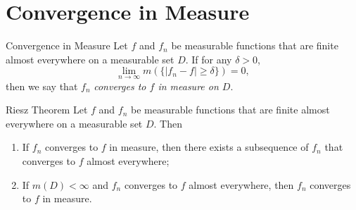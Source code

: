 \section{Convergence in Measure}

\begin{definition}{Convergence in Measure}{}
  Let $f$ and $f_n$ be measurable functions that are finite almost everywhere on
  a measurable set $D$. If for any $\delta > 0$,
  \begin{equation}
    \lim \limits _{n \rightarrow \infty} m(\{|f_n - f| \geq \delta\}) = 0,
  \end{equation}
  then we say that $f_n$ \emph{converges to $f$ in measure on $D$}.
\end{definition}

\begin{theorem}{Riesz Theorem}{}
  Let $f$ and $f_n$ be measurable functions that are finite almost everywhere on
  a measurable set $D$. Then
  \begin{enumerate}
  \item If $f_n$ converges to $f$ in measure, then there exists a subsequence of
    $f_n$ that converges to $f$ almost everywhere;
  \item If $m(D) < \infty$ and $f_n$ converges to $f$ almost everywhere,
    then $f_n$ converges to $f$ in measure.
  \end{enumerate}
\end{theorem}









